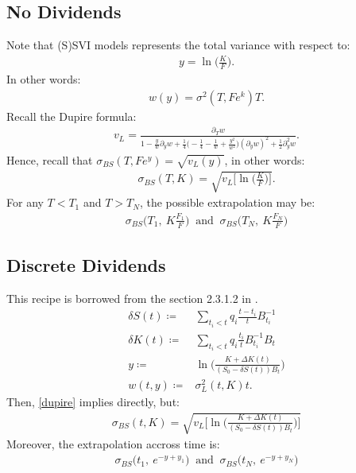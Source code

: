 \documentclass[a4paper, 11pt]{article}              %
\numberwithin{equation}{section}
\theoremstyle{plain}
\newcommand{\1}{\mathds{1}}
\newcommand{\SUM}{\displaystyle\sum}
\theoremstyle{plain}
\theoremstyle{definition}
\theoremstyle{plain}
\begin{document}
\subsection{No Dividends}
Note that (S)SVI models represents the total variance with respect to:
\begin{align}
y = \ln\big(\frac{K}{F}\big).
\end{align}
In other words:
\begin{align}
  w(y) = \sigma^2(T, Fe^k)T. 
\end{align}
Recall the Dupire formula:
\begin{align}
  v_L = \frac{\partial_T w}{1-\frac{y}{w}\partial_y w
  +\frac{1}{4}\Big(-\frac{1}{4} - \frac{1}{w} +
  \frac{y^2}{w^2}\Big)(\partial_y w)^2 + \frac{1}{2}\partial^2_y w}. \label{dupire}
\end{align}
Hence, recall that $\sigma_{BS}(T, Fe^y) = \sqrt{v_L(y)}$, in other words:
\begin{align}
 \sigma_{BS}(T, K) = \sqrt{v_L\bigg[\ln\big(\frac{K}{F}\big)\bigg]}.
\end{align}
For any $T <  T_1$ and $T >  T_N$, the possible extrapolation may be:
\begin{align}
  \sigma_{BS}\bigg(T_1, ~K\frac{F_1}{F}\bigg) ~\text{ and }~ \sigma_{BS}\bigg(T_N, ~K\frac{F_N}{F}\bigg)
\end{align}

\subsection{Discrete Dividends}
This recipe is borrowed from the section 2.3.1.2 in 
\cite{bergomi2015stochastic}.
\begin{align}
  \delta S(t)\coloneqq& \SUM_{t_i <t}q_i\frac{t-t_i}{t}B_{t_i}^{-1}\nonumber\\
  \delta K(t)\coloneqq& \SUM_{t_i <t}q_i\frac{t_i}{t}B_{t_i}^{-1}B_t \nonumber\\
  y\coloneqq& \ln\bigg(\frac{K+\Delta K(t)}{(S_0 - \delta S(t))B_t}\bigg)\nonumber\\
  w(t, y)\coloneqq& \sigma_{L}^2(t, K)t.\nonumber 
\end{align}
Then, \cref{dupire} implies directly, but:
\begin{align}
  \sigma_{BS}(t, K) = \sqrt{v_L\bigg[\ln\bigg(\frac{K+\Delta K(t)}{(S_0 - \delta S(t))B_t}\bigg)\bigg]}
\end{align}
Moreover, the extrapolation accross time is:
\begin{align}
  \sigma_{BS}\bigg(t_1, ~e^{-y+y_1} \bigg) ~\text{ and }~ \sigma_{BS}\bigg(t_N, ~e^{-y+y_N}\bigg)
\end{align}
\end{document}
